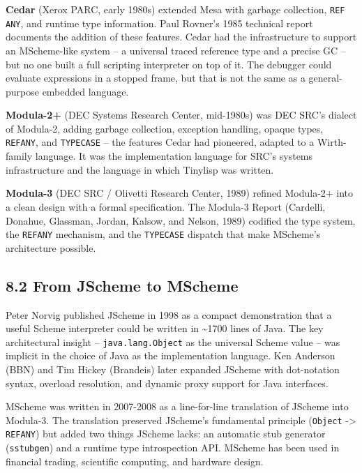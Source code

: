 \documentclass[
  12pt,
]{report}
\newcommand{\passthrough}[1]{#1}
\begin{document}
\textbf{Cedar} (Xerox PARC, early 1980s) extended Mesa with garbage
collection, \passthrough{\lstinline!REF ANY!}, and runtime type
information. Paul Rovner's 1985 technical report documents the addition
of these features. Cedar had the infrastructure to support an
MScheme-like system -- a universal traced reference type and a precise
GC -- but no one built a full scripting interpreter on top of it. The
debugger could evaluate expressions in a stopped frame, but that is not
the same as a general-purpose embedded language.

\textbf{Modula-2+} (DEC Systems Research Center, mid-1980s) was DEC
SRC's dialect of Modula-2, adding garbage collection, exception
handling, opaque types, \passthrough{\lstinline!REFANY!}, and
\passthrough{\lstinline!TYPECASE!} -- the features Cedar had pioneered,
adapted to a Wirth-family language. It was the implementation language
for SRC's systems infrastructure and the language in which Tinylisp was
written.

\textbf{Modula-3} (DEC SRC / Olivetti Research Center, 1989) refined
Modula-2+ into a clean design with a formal specification. The Modula-3
Report (Cardelli, Donahue, Glassman, Jordan, Kalsow, and Nelson, 1989)
codified the type system, the \passthrough{\lstinline!REFANY!}
mechanism, and the \passthrough{\lstinline!TYPECASE!} dispatch that make
MScheme's architecture possible.

\subsection{8.2 From JScheme to MScheme}\label{from-jscheme-to-mscheme}

Peter Norvig published JScheme in 1998 as a compact demonstration that a
useful Scheme interpreter could be written in \textasciitilde1700 lines
of Java. The key architectural insight --
\passthrough{\lstinline!java.lang.Object!} as the universal Scheme value
-- was implicit in the choice of Java as the implementation language.
Ken Anderson (BBN) and Tim Hickey (Brandeis) later expanded JScheme with
dot-notation syntax, overload resolution, and dynamic proxy support for
Java interfaces.

MScheme was written in 2007-2008 as a line-for-line translation of
JScheme into Modula-3. The translation preserved JScheme's fundamental
principle (\passthrough{\lstinline!Object!} -\textgreater{}
\passthrough{\lstinline!REFANY!}) but added two things JScheme lacks: an
automatic stub generator (\passthrough{\lstinline!sstubgen!}) and a
runtime type introspection API. MScheme has been used in financial
trading, scientific computing, and hardware design.
\end{document}
